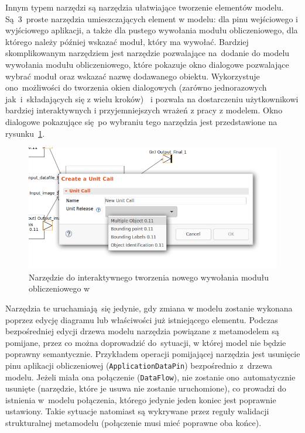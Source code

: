 Innym typem narzędzi są narzędzia ułatwiające tworzenie elementów modelu.
Są~3~proste narzędzia umieszczających element w modelu: dla pinu wejściowego i
wyjściowego aplikacji, a także dla pustego wywołania modułu obliczeniowego, dla
którego należy później wskazać moduł, który ma wywołać. Bardziej skomplikowanym
narzędziem jest narzędzie pozwalające na~dodanie do modelu wywołania modułu
obliczeniowego, które pokazuje okno dialogowe pozwalające wybrać moduł oraz
wskazać nazwę dodawanego obiektu. Wykorzystuje ono~możliwości \SiriusDesktop{}
do tworzenia okien dialogowych (zarówno jednorazowych
jak~i~składających się z wielu
kroków)~\cite{sirius-desktop-documentation-tools} i
pozwala na dostarczeniu użytkownikowi
bardziej interaktywnych i przyjemniejszych wrażeń z pracy z modelem. Okno
dialogowe
pokazujące się po wybraniu
tego narzędzia jest przedstawione na
rysunku~\ref{rys:sirius-desktop-create-unit-call-tool}.

\begin{figure}[!hb]
	\centering

	\includegraphics[width=0.95\linewidth]{./images/sirius-desktop-create-unit-call-tool.png}
	\caption{Narzędzie do interaktywnego tworzenia nowego wywołania modułu
		obliczeniowego w~\SiriusDesktop{}}\label{rys:sirius-desktop-create-unit-call-tool}
\end{figure}

Narzędzia te uruchamiają się jedynie, gdy zmiana w modelu zostanie wykonana
poprzez edycję diagramu lub właściwości już istniejącego elementu. Podczas
bezpośredniej edycji drzewa modelu narzędzia powiązane z metamodelem są
pomijane, przez co można doprowadzić do~sytuacji, w której model nie będzie
poprawny
semantycznie. Przykładem operacji pomijającej narzędzia jest usunięcie pinu
aplikacji obliczeniowej (\texttt{ApplicationDataPin}) bezpośrednio z~drzewa
modelu. Jeżeli miała ona połączenie (\texttt{DataFlow}), nie zostanie
ono~automatycznie usunięte (narzędzie, które je usuwa nie zostanie
uruchomione), co
prowadzi do istnienia w~modelu połączenia, którego jedynie jeden koniec jest
poprawnie ustawiony. Takie sytuacje natomiast są wykrywane przez reguły
walidacji strukturalnej metamodelu (połączenie musi mieć poprawne oba końce).

